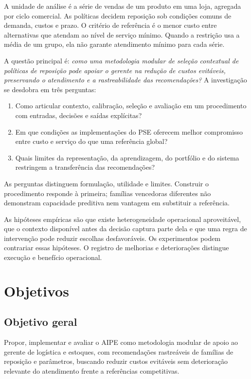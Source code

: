 A unidade de análise é a série de vendas de um produto em uma loja, agregada por ciclo comercial. As políticas decidem reposição sob condições comuns de demanda, custos e prazo. O critério de referência é o menor custo entre alternativas que atendam ao nível de serviço mínimo. Quando a restrição usa a média de um grupo, ela não garante atendimento mínimo para cada série.

A questão principal é: \emph{como uma metodologia modular de seleção contextual de políticas de reposição pode apoiar o gerente na redução de custos evitáveis, preservando o atendimento e a rastreabilidade das recomendações?} A investigação se desdobra em três perguntas:

\begin{enumerate}
  \item Como articular contexto, calibração, seleção e avaliação em um procedimento com entradas, decisões e saídas explícitas?
  \item Em que condições as implementações do PSE oferecem melhor compromisso entre custo e serviço do que uma referência global?
  \item Quais limites da representação, da aprendizagem, do portfólio e do sistema restringem a transferência das recomendações?
\end{enumerate}

As perguntas distinguem formulação, utilidade e limites. Construir o procedimento responde à primeira; famílias vencedoras diferentes não demonstram capacidade preditiva nem vantagem em substituir a referência.

As hipóteses empíricas são que existe heterogeneidade operacional aproveitável, que o contexto disponível antes da decisão captura parte dela e que uma regra de intervenção pode reduzir escolhas desfavoráveis. Os experimentos podem contrariar essas hipóteses. O registro de melhorias e deteriorações distingue execução e benefício operacional.

\section{Objetivos}

\subsection*{Objetivo geral}

Propor, implementar e avaliar o AIPE como metodologia modular de apoio ao gerente de logística e estoques, com recomendações rastreáveis de famílias de reposição e parâmetros, buscando reduzir custos evitáveis sem deterioração relevante do atendimento frente a referências competitivas.

